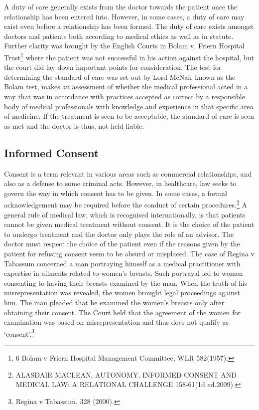 \begin{multicols}{2}
\noi
A duty of care generally exists from the doctor towards the patient once the relationship
has been entered into. However, in some cases, a duty of care may exist even before a
relationship has been formed. The duty of care exists amongst doctors and patients both
according to medical ethics as well as in statute. Further clarity was brought by the
English Courts in Bolam v. Friern Hospital Trust\footnote{6 Bolam v Friern Hospital Management Committee, WLR 582(1957).} where the patient was not successful
in his action against the hospital, but the court did lay down important points for
consideration. The test for determining the standard of care was set out by Lord McNair
known as the Bolam test, makes an assessment of whether the medical professional
acted in a way that was in accordance with practices accepted as correct by a
responsible body of medical professionals with knowledge and experience in that specific area of medicine. If the treatment is seen to be acceptable, the standard of care
is seen as met and the doctor is thus, not held liable.

\vspace{-.3cm}

\subsection*{Informed Consent}

\vspace{-.2cm}

\noi
Consent is a term relevant in various areas such as commercial relationships, and also
as a defense to some criminal acts. However, in healthcare, law seeks to govern the way
in which consent has to be given. In some cases, a formal acknowledgement may be
required before the conduct of certain procedures.\footnote{ALASDAIR MACLEAN, AUTONOMY, INFORMED CONSENT AND MEDICAL LAW: A RELATIONAL CHALLENGE 158-61(1d ed.2009).} A general rule of medical law, which
is recognised internationally, is that patients cannot be given medical treatment without
consent. It is the choice of the patient to undergo treatment and the doctor only plays
the role of an advisor. The doctor must respect the choice of the patient even if the
reasons given by the patient for refusing consent seem to be absurd or misplaced. The
case of Regina v Tabassum concerned a man portraying himself as a medical practitioner
with expertise in ailments related to women’s breasts. Such portrayal led to women
consenting to having their breasts examined by the man. When the truth of his
misrepresentation was revealed, the women brought legal proceedings against him. The
man pleaded that he examined the women’s breasts only after obtaining their consent.
The Court held that the agreement of the women for examination was based on
misrepresentation and thus does not qualify as ‘consent’.\footnote{Regina v Tabassum, 328 (2000).}


\end{multicols}

